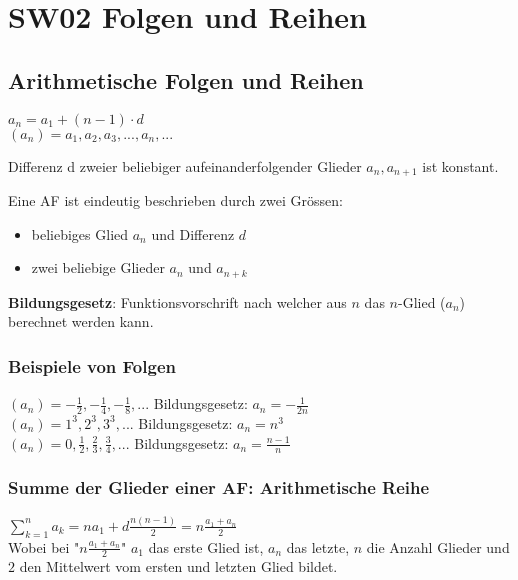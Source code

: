 \documentclass[../main.tex]{subfiles}
\begin{document}
\chapter{SW02 Folgen und Reihen}
\section{Arithmetische Folgen und Reihen}
$a_n=a_1+(n-1)\cdot d$ \\
$(a_n) = a_1,a_2,a_3,...,a_n,...$

\begin{flushleft}
Differenz d zweier beliebiger aufeinanderfolgender Glieder $a_n,a_{n+1}$ ist konstant.
\end{flushleft}

Eine AF ist eindeutig beschrieben durch zwei Grössen:
\begin{itemize}
    \item beliebiges Glied $a_n$ und Differenz $d$
    \item zwei beliebige Glieder $a_n$ und $a_{n+k}$
\end{itemize}

\begin{flushleft}
\textbf{Bildungsgesetz}: Funktionsvorschrift nach welcher aus $n$ das $n$-Glied ($a_n$) berechnet werden kann.
\end{flushleft}

\subsection{Beispiele von Folgen}
$(a_n) = -\frac{1}{2},-\frac{1}{4},-\frac{1}{8},...$ Bildungsgesetz: $a_n=-\frac{1}{2n}$ \\ [7pt]
$(a_n) = 1^3,2^3,3^3,...$ Bildungsgesetz: $a_n=n^3$ \\ [7pt]
$(a_n) = 0,\frac{1}{2},\frac{2}{3},\frac{3}{4},...$ Bildungsgesetz: $a_n=\frac{n-1}{n}$

\subsection{Summe der Glieder einer AF: Arithmetische Reihe}
$\sum\limits_{k=1}^n a_k = na_1 + d \frac{n(n-1)}{2} = n \frac{a_1 + a_n}{2}$\\ [7pt]
Wobei bei "$n \frac{a_1 + a_n}{2}$" $a_1$ das erste Glied ist, $a_n$ das letzte, $n$ die Anzahl Glieder und $2$ den Mittelwert vom ersten und letzten Glied bildet.
\end{document}
